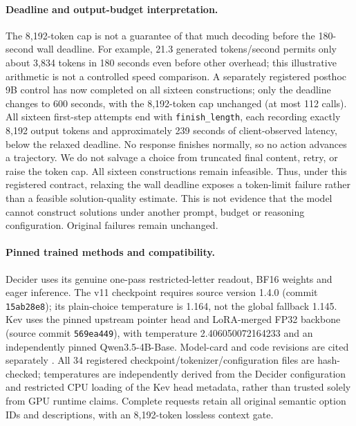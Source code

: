 \documentclass[11pt]{article}
\begin{document}
\paragraph{Deadline and output-budget interpretation.}
The 8,192-token cap is not a guarantee of that much decoding before the
180-second wall deadline. For example, 21.3 generated tokens/second permits
only about 3,834 tokens in 180 seconds even before other overhead; this
illustrative arithmetic is not a controlled speed comparison. A separately
registered posthoc 9B control has now completed on all sixteen constructions;
only the deadline changes to 600 seconds, with the 8,192-token cap unchanged
(at most 112 calls). All sixteen first-step attempts end with
\texttt{finish\_length}, each recording exactly 8,192 output tokens and
approximately 239 seconds of client-observed latency, below the relaxed
deadline. No response finishes normally, so no action advances a trajectory.
We do not salvage a choice from truncated final content, retry, or raise the
token cap. All sixteen constructions remain infeasible. Thus, under this
registered contract, relaxing the wall deadline exposes a token-limit
failure rather than a feasible solution-quality estimate.
This is not evidence that the model cannot construct solutions under another
prompt, budget or reasoning configuration. Original failures remain unchanged.

\begin{table}[ht]
\centering\small

\caption{Completed timeout-only Qwen9 control on the same sixteen constructions.
All four cases per task remain in denominators. The 180-second arm has
wall-timeout failures; the 600-second arm has token-limit failures.
Conditional objective gaps are undefined in both arms, not zero.}
\label{tab:deadline-control}
\end{table}

\paragraph{Pinned trained methods and compatibility.}
Decider uses its genuine one-pass restricted-letter readout, BF16 weights and
eager inference. The v11 checkpoint requires source version 1.4.0
(commit \texttt{15ab28e8}); its plain-choice temperature is 1.164, not the
global fallback 1.145. Kev uses the pinned upstream pointer head and
LoRA-merged FP32 backbone (source commit \texttt{569ea449}), with temperature
2.406050072164233 and an independently pinned Qwen3.5-4B-Base.
Model-card and code revisions are cited separately
\cite{decider2026model,decider2026code,kev2026model,kev2026code}.
All 34 registered checkpoint/tokenizer/configuration files are hash-checked;
temperatures are independently derived from the Decider configuration and
restricted CPU loading of the Kev head metadata, rather than trusted solely
from GPU runtime claims. Complete requests retain all original semantic
option IDs and descriptions, with an 8,192-token lossless context gate.
\end{document}
